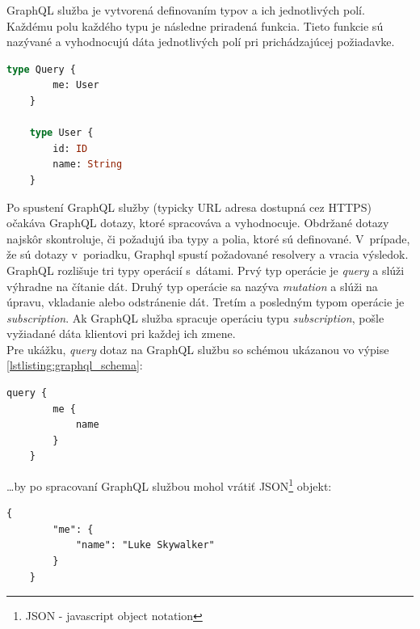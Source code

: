 \noindent GraphQL služba je vytvorená definovaním typov a ich jednotlivých polí. Každému polu každého typu je následne priradená funkcia. \cite{GraphQL} Tieto funkcie sú nazývané  a vyhodnocujú dáta jednotlivých polí pri prichádzajúcej požiadavke. \\

\begin{lstlisting}[label=lstlisting:graphql_schema, language=GraphQL, caption=Príklad jednoduchej GraphQL schémy. \cite{GraphQL}]
	type Query {
		me: User
	}

	type User {
		id: ID
		name: String
	}
\end{lstlisting}

\medskip

\noindent Po spustení GraphQL služby (typicky URL adresa dostupná cez HTTPS) očakáva GraphQL dotazy, ktoré spracováva a vyhodnocuje. Obdržané dotazy najskôr skontroluje, či požadujú iba typy a polia, ktoré sú definované. V~prípade, že sú dotazy v~poriadku, Graphql spustí požadované resolvery a vracia výsledok. \cite{GraphQL} \\

\noindent GraphQL rozlišuje tri typy operácií s~dátami. Prvý typ operácie je \emph{query} a slúži výhradne na čítanie dát. Druhý typ operácie sa nazýva \emph{mutation} a slúži na úpravu, vkladanie alebo odstránenie dát. Tretím a posledným typom operácie je \emph{subscription}. Ak GraphQL služba spracuje operáciu typu \emph{subscription}, pošle vyžiadané dáta klientovi pri každej ich zmene. \\

\noindent Pre ukážku, \emph{query} dotaz na GraphQL službu so schémou ukázanou vo výpise \ref{lstlisting:graphql_schema}: \\

\begin{lstlisting}[caption=Príklad \emph{query} dotazu na GraphQL službu. \cite{GraphQL}]
	query {
		me {
			name
		}
	}
\end{lstlisting}

\medskip

\ldots by po spracovaní GraphQL službou mohol vrátiť JSON\footnote{JSON - javascript object notation} objekt: \\

\begin{lstlisting}[caption=Príklad dát obdržaných z~GraphQL služby. \cite{GraphQL}]
	{
		"me": {
			"name": "Luke Skywalker"
		}
	}
\end{lstlisting}

